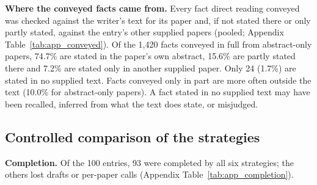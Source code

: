 \documentclass{article} %
\begin{document}
\textbf{Where the conveyed facts came from.} Every fact direct reading conveyed was checked against the writer's text for its paper and, if not stated there or only partly stated, against the entry's other supplied papers (pooled; Appendix Table~\ref{tab:app_conveyed}). Of the 1,420 facts conveyed in full from abstract-only papers, 74.7\% are stated in the paper's own abstract, 15.6\% are partly stated there and 7.2\% are stated only in another supplied paper. Only 24 (1.7\%) are stated in no supplied text. Facts conveyed only in part are more often outside the text (10.0\% for abstract-only papers). A fact stated in no supplied text may have been recalled, inferred from what the text does state, or misjudged.

\subsection{Controlled comparison of the strategies}
\label{sec:main}
\textbf{Completion.} Of the 100 entries, 93 were completed by all six strategies; the others lost drafts or per-paper calls (Appendix Table~\ref{tab:app_completion}).
\end{document}
